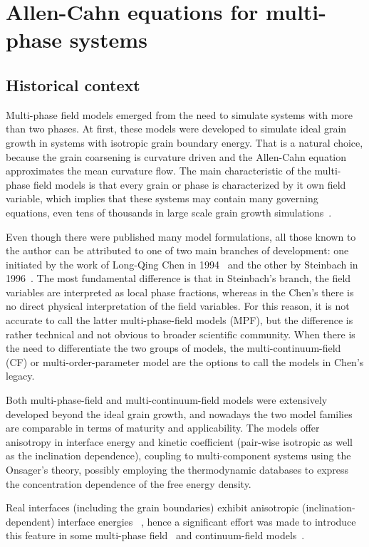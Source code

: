 \section{Allen-Cahn equations for multi-phase systems}
	\subsection{Historical context}
	Multi-phase field models emerged from the need to simulate systems with more than two phases. At first, these models were developed to simulate ideal grain growth in systems with isotropic grain boundary energy. That is a natural choice, because the grain coarsening is curvature driven and the Allen-Cahn equation approximates the mean curvature flow. The main characteristic of the multi-phase field models is that every grain or phase is characterized by it own field variable, which implies that these systems may contain many governing equations, even tens of thousands in large scale grain growth simulations~\cite{Yadav2018}.
	
	Even though there were published many model formulations, all those known to the author can be attributed to one of two main branches of development: one initiated by the work of Long-Qing Chen in 1994~\cite{Chen1994} and the other by Steinbach in 1996~\cite{Steinbach1996}. The most fundamental difference is that in Steinbach's branch, the field variables are interpreted as local phase fractions, whereas in the Chen's there is no direct physical interpretation of the field variables. For this reason, it is not accurate to call the latter multi-phase-field models (MPF), but the difference is rather technical and not obvious to broader scientific community. When there is the need to differentiate the two groups of models, the multi-continuum-field (CF) or multi-order-parameter model are the options to call the models in Chen's legacy.
	
	Both multi-phase-field and multi-continuum-field models were extensively developed beyond the ideal grain growth, and nowadays the two model families are comparable in terms of maturity and applicability. The models offer anisotropy in interface energy and kinetic coefficient (pair-wise isotropic as well as the inclination dependence), coupling to multi-component systems using the Onsager's theory, possibly employing the thermodynamic databases to express the concentration dependence of the free energy density. 
	
	Real interfaces (including the grain boundaries) exhibit anisotropic (inclination-dependent) interface energies ~\cite{Olmsted2009,Bulatov2014}, hence a significant effort was made to introduce this feature in some multi-phase field~\cite{Garcke1999,Toth2015,Salama2020,Wendler2011,} and continuum-field models~\cite{Kazaryan2000,Moelans2008}.
	
